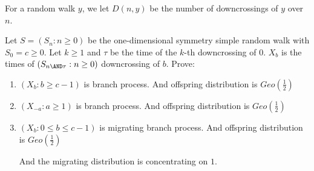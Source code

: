 \documentclass{ctexart}
\newif\ifpreface
\begin{document}
\large
\setlength{\baselineskip}{1.2em}
\ifpreface
  
\else
\fi
{}
  For a random walk \(y\), we let \(D(n,y)\) be the number of downcrossings of \(y\) over \(n\).
\begin{problem}\label{pro:1}
  Let \(S=(S_n:n \geq 0)\) be the one-dimensional symmetry simple random walk with \(S_0=c \geq 0\).
  Let \(k \geq 1\) and \(\tau\) be the time of the \(k\)-th downcrossing of \(0\).
  \(X_b\) is the times of \((S_{n \AND \tau}:n \geq 0)\) downcrossing of \(b\). Prove:
  \begin{enumerate}
    \item \((X_b:b \geq c-1)\) is branch process.
      And offspring distribution is \(Geo(\frac{1}{2})\)

    \item \((X_{-a}:a \geq 1)\) is branch process.
      And offspring distribution is \(Geo(\frac{1}{2})\)

    \item \((X_b:0 \leq b \leq c-1)\) is migrating branch process.
      And offspring distribution is \(Geo(\frac{1}{2})\)

      And the migrating distribution is concentrating on \(1\).

  \end{enumerate}
\end{problem}
\end{document}
